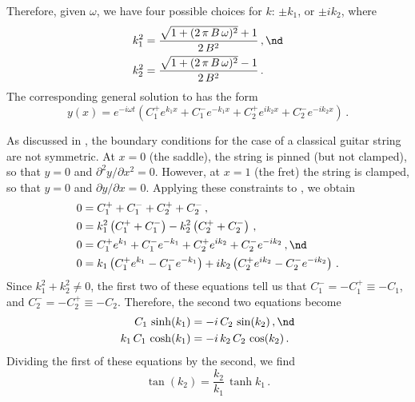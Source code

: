 Therefore, given $\omega$, we have four possible choices for $k$: $\pm k_1$, or $\pm i k_2$, where
 \begin{subequations} \label{eqn:disp_eqns}
 \begin{align}
\label{eqn:disp_eqn_1} k_1^2 &= \frac{\sqrt{1 + (2\, \pi\, B\, \omega)^2} + 1}{2\, B^2}\, , \nd \\
\label{eqn:disp_eqn_2} k_2^2 &= \frac{\sqrt{1 + (2\, \pi\, B\, \omega)^2} - 1}{2\, B^2}\, .
 \end{align}
 \end{subequations}
The corresponding general solution to  has the form
 \begin{equation} \label{eqn:soln_dim}
y(x) = e^{-i \omega t} \left( C_1^+ e^{k_1 x} + C_1^- e^{-k_1 x} + C_2^+ e^{i k_2 x} + C_2^- e^{-i k_2 x} \right)\, .
 \end{equation}

As discussed in , the boundary conditions for the case of a classical guitar string are not symmetric. At $x = 0$ (the saddle), the string is pinned (but not clamped), so that $y = 0$ and $\partial^2 y/\partial x^2 = 0$. However, at $x = 1$ (the fret) the string is clamped, so that $y = 0$ and $\partial y/\partial x = 0$. Applying these constraints to , we obtain
 \begin{subequations}
 \begin{align}
  0 &= C_1^+ + C_1^- + C_2^+ + C_2^-\, , \\
  0 &= k_1^2 \left(C_1^+ + C_1^-\right) - k_2^2 \left(C_2^+ + C_2^-\right)\, , \\
  0 &= C_1^+ e^{k_1} + C_1^- e^{-k_1} + C_2^+ e^{i k_2} + C_2^- e^{-i k_2}\, , \nd \\
  0 &= k_1 \left(C_1^+ e^{k_1} - C_1^- e^{-k_1}\right) + i k_2 \left(C_2^+ e^{i k_2} - C_2^- e^{-i k_2}\right)\, .
 \end{align}
 \end{subequations}
Since $k_1^2 + k_2^2 \ne 0$, the first two of these equations tell us that $C_1^- = -C_1^+ \equiv -C_1$, and $C_2^- = -C_2^+ \equiv -C_2$. Therefore, the second two equations become
 \begin{subequations}
 \begin{align}
C_1\, \sinh(k_1) &= - i\, C_2\, \sin(k_2)\, , \nd \\
k_1\, C_1\, \cosh(k_1) &= -i\, k_2\, C_2\, \cos(k_2)\, .
 \end{align}
 \end{subequations}
Dividing the first of these equations by the second, we find
 \begin{equation} \label{eqn:tran_eqn_12}
\tan(k_2) = \frac{k_2}{k_1}\, \tanh{k_1}\, .
 \end{equation}

